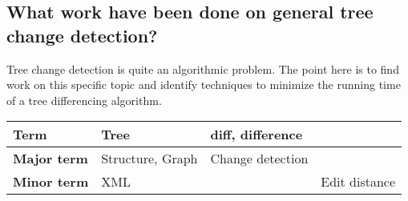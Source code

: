 \documentclass[12pt]{article}
\begin{document}
\subsection{What work have been done on general tree change detection?}
Tree change detection is quite an algorithmic problem. The point here is to find work on this specific topic and identify techniques to minimize the running time of a tree differencing algorithm.

\begin{tabular}{ | l | l | l | l |}
    \hline
    \textbf{Term} & Tree & diff, difference \\ \hline
    \textbf{Major term} & Structure, Graph & Change detection \\ \hline
    \textbf{Minor term} & XML & & Edit distance
\end{tabular}

\clearpage
\end{document}
